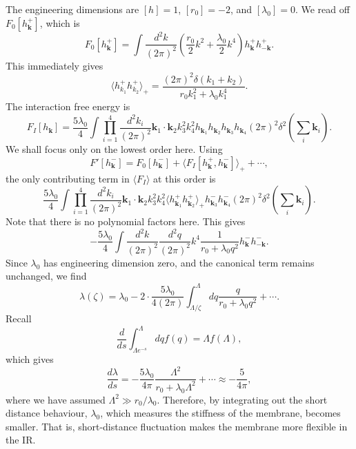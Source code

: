 \begin{solution}
    The engineering dimensions are $[h] = 1$, $[r_0] = -2$, and $[\lambda_0] = 0$. We read off $F_0[h_\mathbf{k}^+]$, which is
    \begin{equation}
        F_0[h_\mathbf{k}^+] = \int \frac{d^2k}{(2\pi)^2}\left(\frac{r_0}{2}k^2 + \frac{\lambda_0}{2}k^4\right)h_\mathbf{k}^+ h_{-\mathbf{k}}^+.
    \end{equation}
    This immediately gives
    \begin{equation}
            \langle h_{k_1}^+h_{k_2}^+\rangle_+
    =\frac{(2\pi)^2\delta(k_1+k_2)}
    {r_0k_1^2+\lambda_0k_1^4}.
    \end{equation}
    The interaction free energy is
    \begin{equation}
        F_I[h_\mathbf{k}] = \frac{5\lambda_0}{4}\int\prod_{i=1}^4\frac{d^2k_i}{(2\pi)^2}\mathbf{k}_1 \cdot \mathbf{k}_2 k_3^2 k_4^2h_{\mathbf{k}_1}h_{\mathbf{k}_2}h_{\mathbf{k}_3}h_{\mathbf{k}_4}(2\pi)^2\delta^2\left(\sum_i\mathbf{k}_i\right).
    \end{equation}
    We shall focus only on the lowest order here.
    Using
    \begin{equation}
        F'[h_\mathbf{k}^-] = F_0[h_\mathbf{k}^-] +  \langle F_I[h_\mathbf{k}^+, h^-_\mathbf{k}]\rangle_+ + \cdots,
    \end{equation}
    the only contributing term in $\langle F_I\rangle$ at this order is
    \begin{equation}
        \frac{5\lambda_0}{4}\int\prod_{i=1}^4\frac{d^2k_i}{(2\pi)^2}\mathbf{k}_1 \cdot \mathbf{k}_2 k_3^2 k_4^2\langle h_{\mathbf{k}_1}^+h_{\mathbf{k}_2}^+\rangle_+h_{\mathbf{k}_3}^-h_{\mathbf{k}_4}^-(2\pi)^2\delta^2\left(\sum_i\mathbf{k}_i\right).
    \end{equation}
    Note that there is no polynomial factors here. This gives
    \begin{equation}
        -\frac{5\lambda_0}{4}\int\frac{d^2k}{(2\pi)^2}\frac{d^2q}{(2\pi)^2} k^4\frac{1}{r_0 + \lambda_0 q^2}h_{\mathbf{k}}^-h_{-\mathbf{k}}^-.
    \end{equation}
    Since $\lambda_0$ has engineering dimension zero, and the canonical term remains unchanged, we find
    \begin{equation}
        \lambda(\zeta) = \lambda_0 - 2\cdot \frac{5\lambda_0}{4(2\pi)}\int^\Lambda_{\Lambda/\zeta}dq \frac{q}{r_0 + \lambda_0q^2} + \cdots .
    \end{equation}
    Recall
    \begin{equation}
        \frac{d}{ds}\int^\Lambda_{\Lambda e^{-s}}dq f(q) = \Lambda f(\Lambda),
    \end{equation}
    which gives
    \begin{equation}
        \frac{d\lambda}{ds} =  -\frac{5\lambda_0}{4\pi}\frac{\Lambda^2}{r_0 + \lambda_0 \Lambda^2} + \cdots \approx -\frac{5}{4\pi},
    \end{equation}
    where we have assumed $\Lambda^2 \gg r_0/\lambda_0$. Therefore, by integrating out the short distance behaviour, $\lambda_0$, which measures the stiffness of the membrane, becomes smaller. That is, short-distance fluctuation makes the membrane more flexible in the IR.
\end{solution}

